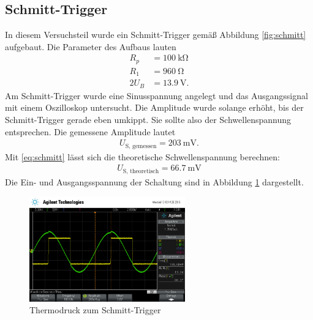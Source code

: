 \subsection{Schmitt-Trigger}
In diesem Versuchsteil wurde ein Schmitt-Trigger gemäß Abbildung \ref{fig:schmitt} aufgebaut.
Die Parameter des Aufbaus lauten
\begin{align}
	R_p &= \SI{100}{\kilo \ohm} \\
	R_1 &= \SI{960}{\ohm} \\
	2U_B &= \SI{13.9}{\volt}.
\end{align}
Am Schmitt-Trigger wurde eine Sinusspannung angelegt und das Ausgangssignal mit einem Oszilloskop untersucht.
Die Amplitude wurde solange erhöht, bis der Schmitt-Trigger gerade eben umkippt.
Sie sollte also der Schwellenspannung entsprechen.
Die gemessene Amplitude lautet
\begin{align}
	U_\text{S, gemessen} = \SI{203}{\milli \volt}.
\end{align}
Mit \eqref{eq:schmitt} lässt sich die theoretische Schwellenspannung berechnen:
\begin{align}
	U_\text{S, theoretisch} = \SI{66,7}{\milli \volt}
\end{align}
Die Ein- und Ausgangsspannung der Schaltung sind in Abbildung \ref{fig:schmittscope} dargestellt.
\begin{figure}
	\centering
	\includegraphics[width=0.6\textwidth]{img/scope_7_schmitt.png}
	\caption{Thermodruck zum Schmitt-Trigger}
	\label{fig:schmittscope}
\end{figure}
